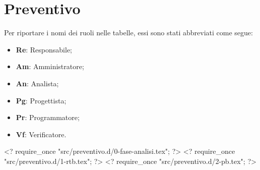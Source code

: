 \nonstopmode
\section{Preventivo}

Per riportare i nomi dei ruoli nelle tabelle, essi sono stati abbreviati come segue:

\begin{itemize}
\item \textbf{Re}: Responsabile;
\item \textbf{Am}: Amministratore;
\item \textbf{An}: Analista;
\item \textbf{Pg}: Progettista;
\item \textbf{Pr}: Programmatore;
\item \textbf{Vf}: Verificatore.
\end{itemize}

<? require_once "src/preventivo.d/0-fase-analisi.tex"; ?>
<? require_once "src/preventivo.d/1-rtb.tex"; ?>
<? require_once "src/preventivo.d/2-pb.tex"; ?>
